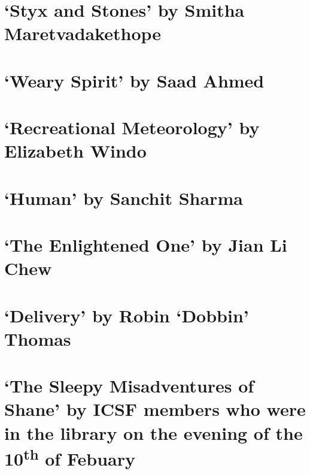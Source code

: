\documentclass[a4paper,14pt]{article}
\begin{document}
\clearpage
\section{`Styx and Stones' by Smitha Maretvadakethope}


\clearpage
\section{`Weary Spirit' by Saad Ahmed}


\clearpage
\section{`Recreational Meteorology' by Elizabeth Windo}


\clearpage
\section{`Human' by Sanchit Sharma}


\clearpage
\section{`The Enlightened One' by Jian Li Chew}


\clearpage
\section{`Delivery' by Robin `Dobbin' Thomas}


\clearpage
\section{`The Sleepy Misadventures of Shane' by ICSF members who were in the library on the evening of the 10\textsuperscript{th} of Febuary}

\end{document}
